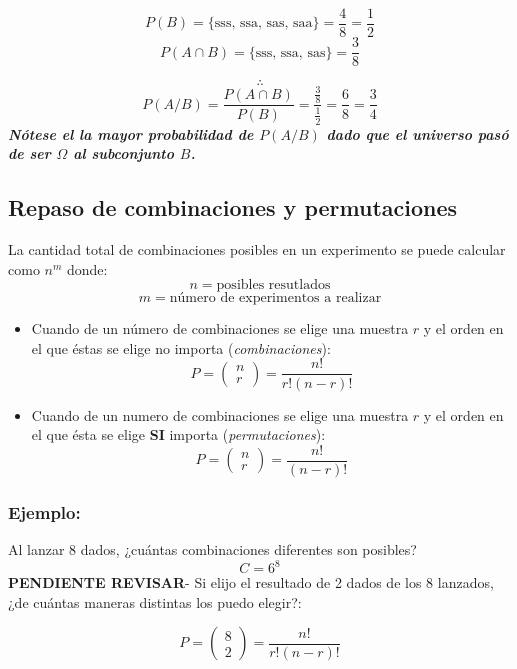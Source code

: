 \documentclass[]{book}
\begin{document}
\[P(B) = \{\text{sss, ssa, sas, saa}\} = \frac{4}{8} = \frac{1}{2}\]
\[P(A\cap B) = \{\text{sss, ssa, sas}\} = \frac{3}{8}\]

\[\therefore\]
\[P(A/B) = \frac {P(A\cap B)}{P(B)} = \frac {\frac {3}{8}}{\frac {1}{2}} = \frac {6}{8} = \frac {3}{4}\]
\textbf{\emph{Nótese el la mayor probabilidad de \(P(A/B)\) dado que el
universo pasó de ser \(\Omega\) al subconjunto \(B\).}}

\subsection{Repaso de combinaciones y
permutaciones}\label{repaso-de-combinaciones-y-permutaciones-1}

 La cantidad total de combinaciones posibles en un experimento se puede
calcular como \(n^m\) donde: \[n = \text{posibles resutlados}\]
\[m = \text{número de experimentos a realizar}\]

\begin{itemize}
\item
  Cuando de un número de combinaciones se elige una muestra \(r\) y el
  orden en el que éstas se elige no importa (\emph{combinaciones}):
  \[P = \left( \begin{array}{c} n \\ r \end{array} \right) = \frac {n!}{r!(n-r)!}\]
\item
  Cuando de un numero de combinaciones se elige una muestra \(r\) y el
  orden en el que ésta se elige \textbf{SI} importa
  (\emph{permutaciones}):
  \[P = \left( \begin{array}{c} n \\ r \end{array} \right) = \frac {n!}{(n-r)!}\]
\end{itemize}

\subsubsection{Ejemplo:}\label{ejemplo-2}

Al lanzar 8 dados, ¿cuántas combinaciones diferentes son posibles?
\[C = 6^8\] \textbf{PENDIENTE REVISAR}- Si elijo el resultado de 2 dados
de los 8 lanzados, ¿de cuántas maneras distintas los puedo elegir?:

\[P = \left( \begin{array}{c} 8 \\ 2 \end{array} \right) = \frac {n!}{r!(n-r)!}\]
\end{document}
